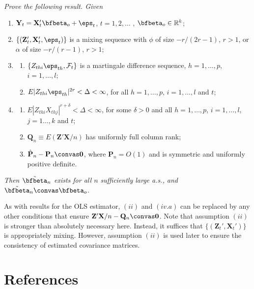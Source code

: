 \begin{exercises}
\item\label{ex:iv-mds} \emph{Prove the following result. Given}
\begin{enumerate}[label=(\roman*)]
\item $\mathbf{Y}_t = \mathbf{X}_t' \bfbeta_o + \eps_t$, \quad $t = 1, 2, \ldots$ , $\bfbeta_o \in \mathbb{R}^k$;
\item $\{(\mathbf{Z}_t', \mathbf{X}_t', \eps_t)\}$ is a mixing sequence with $\phi$ of size $-r/(2r-1)$, $r > 1$, or $\alpha$ of size $-r/(r-1)$, $r > 1$;
\item \begin{enumerate}[label=(\alph*)]
\item $\{Z_{thi} \eps_{th}, \mathcal{F}_t\}$ is a martingale difference sequence, $h = 1, \ldots, p$, $i = 1, \ldots, l$;
\item $E|Z_{thi} \eps_{th}|^{2r} < \Delta < \infty$, for all $h = 1, \ldots, p$, $i = 1, \ldots, l$ and $t$;
\end{enumerate}
\item \begin{enumerate}[label=(\alph*)]
\item $E|Z_{thi} X_{thj}|^{r+\delta} < \Delta < \infty$, for some $\delta > 0$ and all $h = 1, \ldots, p$, $i = 1, \ldots, l$, $j = 1\ldots, k$ and $t$;
\item $\mathbf{Q}_n \equiv E(\mathbf{Z}'\mathbf{X}/n)$ has uniformly full column rank;
\item $\hat{\mathbf{P}}_n - \mathbf{P}_n \convas \mathbf{0}$, where $\mathbf{P}_n = O(1)$ and is symmetric and uniformly positive definite.
\end{enumerate}
\end{enumerate}
\emph{Then $\tilde{\bfbeta}_n$ exists for all $n$ sufficiently large a.s., and $\tilde{\bfbeta}_n \convas \bfbeta_o$.}
\end{exercises}

As with results for the OLS estimator, $(ii)$ and $(iv.a)$ can be replaced by any other conditions that ensure $\mathbf{Z}'\mathbf{X}/n - \mathbf{Q}_n \convas \mathbf{0}$. Note that assumption $(ii)$ is stronger than absolutely necessary here. Instead, it suffices that $\{(\mathbf{Z}_t', \mathbf{X}_t')\}$ is appropriately mixing. However, assumption $(ii)$ is used later to ensure the consistency of estimated covariance matrices.

\section*{References}

